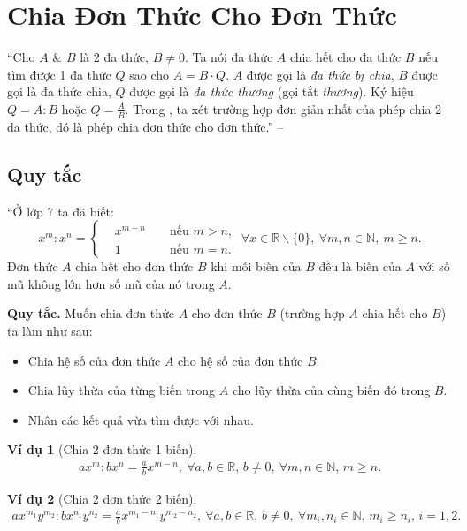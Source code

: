 \documentclass[oneside]{book}
\numberwithin{equation}{section}
\newtheorem{vidu}{Ví dụ}[section]
\begin{document}
\section{Chia Đơn Thức Cho Đơn Thức}
``Cho $A$ \& $B$ là 2 đa thức, $B\ne 0$. Ta nói đa thức $A$ chia hết cho đa thức $B$ nếu tìm được 1 đa thức $Q$ sao cho $A = B\cdot Q$. $A$ được gọi là \textit{đa thức bị chia}, $B$ được gọi là đa thức chia, $Q$ được gọi là \textit{đa thức thương} (gọi tắt \textit{thương}). Ký hiệu $Q = A:B$ hoặc $Q = \frac{A}{B}$. Trong \cite[\S10]{SGK_Toan_8_tap_1}, ta xét trường hợp đơn giản nhất của phép chia 2 đa thức, đó là phép chia đơn thức cho đơn thức.'' -- \cite[p. 25]{SGK_Toan_8_tap_1}

\subsection{Quy tắc}
``Ở lớp 7 ta đã biết:
\begin{equation*}
	x^m:x^n = \left\{\begin{split}
		&x^{m - n}&&\mbox{ nếu } m > n,\\
		&1&&\mbox{ nếu } m = n.
	\end{split}\right.\ \forall x\in\mathbb{R}\backslash\{0\},\ \forall m,n\in\mathbb{N},\ m\ge n.
\end{equation*}
Đơn thức $A$ chia hết cho đơn thức $B$ khi mỗi biến của $B$ đều là biến của $A$ với số mũ không lớn hơn số mũ của nó trong $A$.

\textbf{Quy tắc.} Muốn chia đơn thức $A$ cho đơn thức $B$ (trường hợp $A$ chia hết cho $B$) ta làm như sau:
\begin{itemize}
	\item Chia hệ số của đơn thức $A$ cho hệ số của đơn thức $B$.
	\item Chia lũy thừa của từng biến trong $A$ cho lũy thừa của cùng biến đó trong $B$.
	\item Nhân các kết quả vừa tìm được với nhau.
\end{itemize}

\begin{vidu}[Chia 2 đơn thức 1 biến]
	\begin{align*}
		ax^m:bx^n = \frac{a}{b}x^{m-n},\ \forall a,b\in\mathbb{R},\,b\ne 0,\ \forall m,n\in\mathbb{N},\,m\ge n.
	\end{align*}
\end{vidu}

\begin{vidu}[Chia 2 đơn thức 2 biến]
	\begin{align*}
		ax^{m_1}y^{m_2}:bx^{n_1}y^{n_2} = \frac{a}{b}x^{m_1 - n_1}y^{m_2 - n_2},\ \forall a,b\in\mathbb{R},\,b\ne 0,\ \forall m_i,n_i\in\mathbb{N},\,m_i\ge n_i,\,i = 1,2.
	\end{align*}
\end{vidu}
\end{document}
